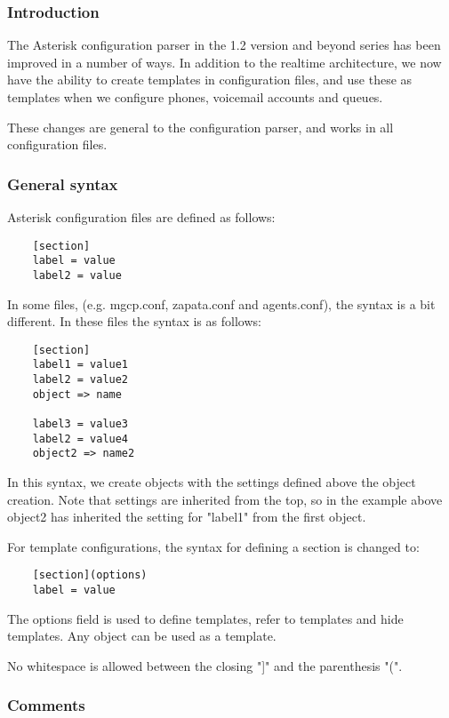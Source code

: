 \subsubsection{Introduction}

The Asterisk configuration parser in the 1.2 version
and beyond series has been improved in a number of ways. In
addition to the realtime architecture, we now have the ability to create
templates in configuration files, and use these as templates when we
configure phones, voicemail accounts and queues.

These changes are general to the configuration parser, and works in
all configuration files. 

\subsubsection{General syntax}
Asterisk configuration files are defined as follows:

\begin{verbatim}
	[section]
	label = value
	label2 = value
\end{verbatim}

In some files, (e.g. mgcp.conf, zapata.conf and agents.conf), the syntax
is a bit different. In these files the syntax is as follows:
	
\begin{verbatim}
	[section]
	label1 = value1
	label2 = value2
	object => name

	label3 = value3
	label2 = value4
	object2 => name2
\end{verbatim}

In this syntax, we create objects with the settings defined above the object
creation. Note that settings are inherited from the top, so in the example 
above object2 has inherited the setting for "label1" from the first object.

For template configurations, the syntax for defining a section is changed
to:
\begin{verbatim}
	[section](options)
	label = value
\end{verbatim}

The options field is used to define templates, refer to templates and hide
templates. Any object can be used as a template.

No whitespace is allowed between the closing "]" and the parenthesis "(".

\subsubsection{Comments}

